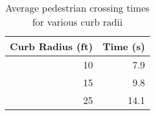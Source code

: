\begin{table}[h]
\centering
\begin{tabular}{@{}rr@{}}
\toprule
\multicolumn{1}{l}{Curb Radius (ft)} & \multicolumn{1}{l}{Time (s)} \\ \midrule
10                                   & 7.9                          \\
15                                   & 9.8                          \\
25                                   & 14.1                       \\ \bottomrule 
\end{tabular}
\caption{Average pedestrian crossing times for various curb radii}\label{table:cross-time-vs-radius}
\end{table}